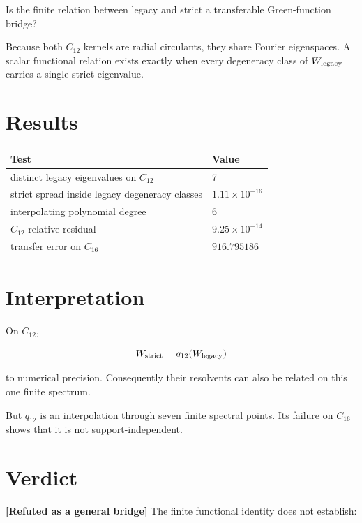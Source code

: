 \documentclass[11pt,a4paper,openany]{report}
\begin{document}
Is the finite relation between legacy and strict a transferable Green-function bridge?

Because both \(C_{12}\) kernels are radial circulants, they share Fourier eigenspaces. A scalar functional relation exists exactly when every degeneracy class of \(W_{\rm legacy}\) carries a single strict eigenvalue.

\section{Results}

\begin{center}
\begingroup\small
\setlength{\tabcolsep}{3.5pt}
\renewcommand{\arraystretch}{1.16}
\begin{longtable}{@{}p{}p{}@{}}
\toprule
\textbf{Test} & \textbf{Value} \\
\midrule
\endhead
distinct legacy eigenvalues on \(C_{12}\) & 7 \\
strict spread inside legacy degeneracy classes & \(1.11\times10^{-16}\) \\
interpolating polynomial degree & 6 \\
\(C_{12}\) relative residual & \(9.25\times10^{-14}\) \\
transfer error on \(C_{16}\) & \(916.795186\) \\
\bottomrule
\end{longtable}
\endgroup
\end{center}

\section{Interpretation}

On \(C_{12}\),

\[
W_{\rm strict}=q_{12}(W_{\rm legacy})
\]

to numerical precision. Consequently their resolvents can also be related on this one finite spectrum.

But \(q_{12}\) is an interpolation through seven finite spectral points. Its failure on \(C_{16}\) shows that it is not support-independent.

\section{Verdict}

\textbf{[Refuted as a general bridge]} The finite functional identity does not establish:
\end{document}

